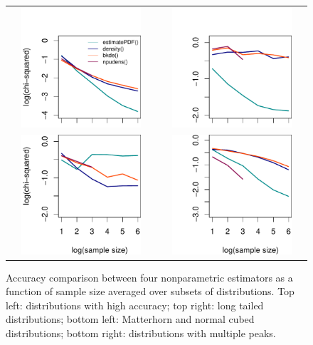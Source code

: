\begin{figure}[tbp]
\centering
\begin{tabular}{p{}p{}}
  \vspace{0pt} \includegraphics[width=2.1in, height=1.75in]{Figure8a.pdf} &
  \vspace{0pt} \includegraphics[width=2.1in, height=1.75in]{Figure8b.pdf} \\
  \vspace{0pt} \includegraphics[width=2.1in, height=1.75in]{Figure8c.pdf} &
  \vspace{0pt} \includegraphics[width=2.1in, height=1.75in]{Figure8d.pdf} 
\end{tabular}
\caption{\label{fig:compareDistributions2} Accuracy comparison between four nonparametric estimators as a function of sample size averaged over subsets of distributions. Top left: distributions with high accuracy; top right: long tailed distributions; bottom left: Matterhorn and normal cubed distributions; bottom right: distributions with multiple peaks.}
\end{figure}

